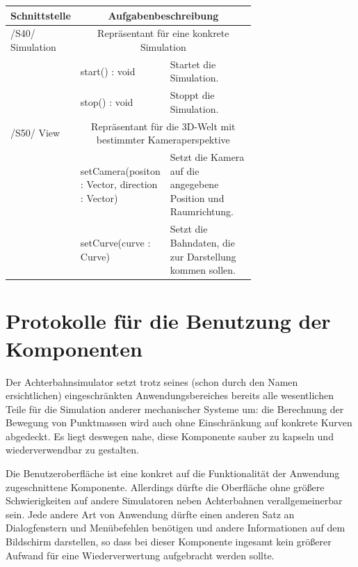 \begin{tabular}[ht]{|l|p{0.35\linewidth}|p{0.35\linewidth}|}
 \hline
 Schnittstelle & \multicolumn{2}{|c|}{Aufgabenbeschreibung}\\
 \hline
 \hline
    /S40/ Simulation & \multicolumn{2}{|c|}{Repräsentant für eine konkrete Simulation}\\
 \hline
 & start() : void & Startet die Simulation.\\ 
 & stop() : void & Stoppt die Simulation. \\ 
\hline
	/S50/ View & \multicolumn{2}{|c|}{Repräsentant für die 3D-Welt mit bestimmter Kameraperspektive}\\
\hline
 & setCamera(positon : Vector, direction : Vector) & Setzt die Kamera auf die angegebene Position und Raumrichtung. \\ 
 \hline

 & setCurve(curve : Curve) & Setzt die Bahndaten, die zur Darstellung kommen sollen. \\ 
 \hline

 \end{tabular}





\section{Protokolle für die Benutzung der Komponenten}


Der Achterbahnsimulator setzt trotz seines (schon durch den Namen ersichtlichen)
eingeschränkten Anwendungsbereiches bereits alle wesentlichen Teile für die
Simulation anderer mechanischer Systeme um: die Berechnung der Bewegung von
Punktmassen wird auch ohne Einschränkung auf konkrete Kurven abgedeckt. Es liegt
deswegen nahe, diese Komponente sauber zu kapseln und wiederverwendbar zu gestalten.

Die Benutzeroberfläche ist eine konkret auf die Funktionalität der Anwendung
zugeschnittene Komponente. Allerdings dürfte die Oberfläche ohne größere
Schwierigkeiten auf andere Simulatoren neben Achterbahnen verallgemeinerbar sein.
Jede andere Art von Anwendung dürfte einen anderen Satz an Dialogfenstern und
Menübefehlen benötigen und andere Informationen auf dem Bildschirm darstellen,
so dass bei dieser Komponente ingesamt kein größerer Aufwand für eine
Wiederverwertung aufgebracht werden sollte.

